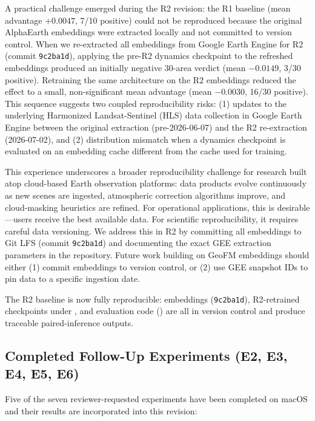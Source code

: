 \documentclass{article}
\begin{document}
A practical challenge emerged during the R2 revision: the R1 baseline (mean advantage $+0.0047$, 7/10 positive) could not be reproduced because the original AlphaEarth embeddings were extracted locally and not committed to version control. When we re-extracted all embeddings from Google Earth Engine for R2 (commit \texttt{9c2ba1d}), applying the pre-R2 dynamics checkpoint to the refreshed embeddings produced an initially negative 30-area verdict (mean $-0.0149$, 3/30 positive). Retraining the same architecture on the R2 embeddings reduced the effect to a small, non-significant mean advantage (mean $-0.0030$, 16/30 positive). This sequence suggests two coupled reproducibility risks: (1) updates to the underlying Harmonized Landsat-Sentinel (HLS) data collection in Google Earth Engine between the original extraction (pre-2026-06-07) and the R2 re-extraction (2026-07-02), and (2) distribution mismatch when a dynamics checkpoint is evaluated on an embedding cache different from the cache used for training.

This experience underscores a broader reproducibility challenge for research built atop cloud-based Earth observation platforms: data products evolve continuously as new scenes are ingested, atmospheric correction algorithms improve, and cloud-masking heuristics are refined. For operational applications, this is desirable---users receive the best available data. For scientific reproducibility, it requires careful data versioning. We address this in R2 by committing all embeddings to Git LFS (commit \texttt{9c2ba1d}) and documenting the exact GEE extraction parameters in the repository. Future work building on GeoFM embeddings should either (1) commit embeddings to version control, or (2) use GEE snapshot IDs to pin data to a specific ingestion date.

The R2 baseline is now fully reproducible: embeddings (\texttt{9c2ba1d}), R2-retrained checkpoints under , and evaluation code () are all in version control and produce traceable paired-inference outputs.

\subsection{Completed Follow-Up Experiments (E2, E3, E4, E5, E6)}
\label{sec:completed_experiments}

Five of the seven reviewer-requested experiments have been completed on macOS and their results are incorporated into this revision:
\end{document}
